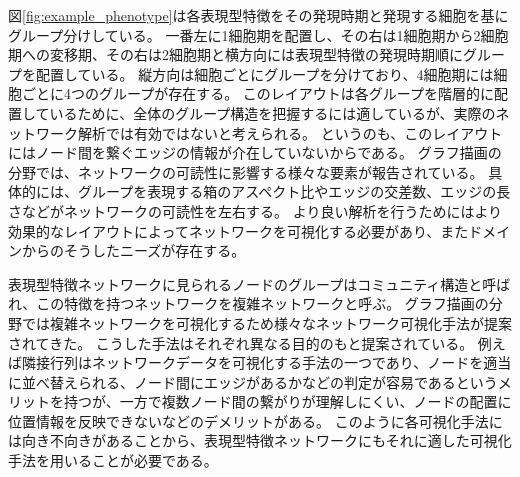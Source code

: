 \documentclass{kuee}
\begin{document}
図\ref{fig:example_phenotype}は各表現型特徴をその発現時期と発現する細胞を基にグループ分けしている。
一番左に1細胞期を配置し、その右は1細胞期から2細胞期への変移期、その右は2細胞期と横方向には表現型特徴の発現時期順にグループを配置している。
縦方向は細胞ごとにグループを分けており、4細胞期には細胞ごとに4つのグループが存在する。
このレイアウトは各グループを階層的に配置しているために、全体のグループ構造を把握するには適しているが、実際のネットワーク解析では有効ではないと考えられる。
というのも、このレイアウトにはノード間を繋ぐエッジの情報が介在していないからである。
グラフ描画の分野では、ネットワークの可読性に影響する様々な要素が報告されている\cite{harel2000fast,koren2003drawing,hachul2004drawing,giacomo}。
具体的には、グループを表現する箱のアスペクト比やエッジの交差数、エッジの長さなどがネットワークの可読性を左右する。
より良い解析を行うためにはより効果的なレイアウトによってネットワークを可視化する必要があり、またドメインからのそうしたニーズが存在する。

表現型特徴ネットワークに見られるノードのグループはコミュニティ構造と呼ばれ、この特徴を持つネットワークを複雑ネットワークと呼ぶ\cite{Newman:2010:NI:1809753,girvan2002community,newman2004detecting}。
グラフ描画の分野では複雑ネットワークを可視化するため様々なネットワーク可視化手法が提案されてきた\cite{Vehlow2017VisualizingGS,doi:10.1177/1473871612455749,saket2014group}。
こうした手法はそれぞれ異なる目的のもと提案されている。
例えば隣接行列はネットワークデータを可視化する手法の一つであり、ノードを適当に並べ替えられる、ノード間にエッジがあるかなどの判定が容易であるというメリットを持つが、一方で複数ノード間の繋がりが理解しにくい、ノードの配置に位置情報を反映できないなどのデメリットがある。
このように各可視化手法には向き不向きがあることから、表現型特徴ネットワークにもそれに適した可視化手法を用いることが必要である。

\end{document}
